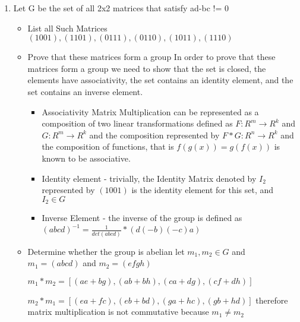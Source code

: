 \documentclass[12pt]{article}
\begin{document}
\begin{enumerate}
\begin{itemize}
  \end{itemize}
  \item Let G be the set of all 2x2 matrices that satisfy ad-bc != 0
    \begin{itemize}
      \item List all Such Matrices
        $(1001), (1101), (0111), (0110), (1011), (1110) $ 
      \item Prove that these matrices form a group
        In order to prove that these matrices form a group we need to show that the set is closed, the elements have associativity, the set contains an identity element, and the set contains an inverse element.
        \begin{itemize}
          \item Associativity
						Matrix Multiplication can be represented as a composition of two linear transformations defined as $F: R^m \rightarrow R^k $ and $ G: R^m \rightarrow R^k $ and the composition
						represented by $ F*G: R^n \rightarrow R^k $ and the composition of functions, that is $ f(g(x)) = g(f(x)) $ is known to be associative.
          \item Identity element - trivially, the Identity Matrix denoted by $ I_2 $ represented by $ (1001) $ is the identity element for this set, and $ I_2 \in G $
          \item Inverse Element - the inverse of the group is defined as $(a b c d)^{-1} = \frac{1}{det(abcd)}*(d (-b) (-c) a)$
        
        \end{itemize}
      \item Determine whether the group is abelian
				let $m_1, m_2 \in G $ and $ m_1 = (abcd) $ and $ m_2 = (efgh) $ 
				\par $ m_1 * m_2 = [(ae + bg), (ab + bh), (ca + dg), (cf + dh)] $
				\par $ m_2 * m_1 = [(ea + fc), (eb + bd), (ga + hc), (gb + hd)] $
				therefore matrix multiplication is not commutative because $ m_1 \ne m_2 $
    \end{itemize}


\end{enumerate}
\end{document}
